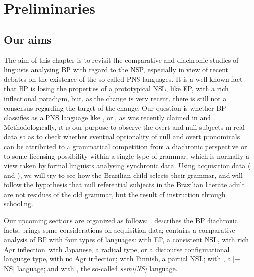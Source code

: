 \documentclass[output=paper]{langsci/langscibook}
\begin{document}
\section{Preliminaries}\label{sec:26.2}

\subsection{Our aims}\label{sec:26.2.1}

The aim of this chapter is to revisit the comparative and diachronic studies of
linguists analysing \gls{BP} with regard to the \gls{NSP}, especially in view
of recent debates on the existence of the so-called \gls{PNS} languages.  It is
a well known fact that \gls{BP} is losing the
properties of a prototypical \gls{NSL}, like \gls{EP}, with a rich
inflectional paradigm, but, as the change is very recent, there is still not a
consensus regarding the target of the change. Our question is whether
\gls{BP} classifies as a \gls{PNS} language like
,  or , as was recently claimed in
\citet{Holmberg2010} and \citet{HolShee2010}. Methodologically, it is our
purpose to observe the overt and null subjects in real data so as to check
whether eventual optionality of null and overt pronominals can be attributed to
a grammatical competition from a diachronic perspective \citep{Kroch1994} or to
some licensing possibility within a single type of grammar, which is normally a
view taken by formal linguists analysing synchronic data. Using
acquisition data (\citealt{Magalhaes2003} and
\citealt{Kato2011}), we will try to see how the Brazilian child selects their
grammar, and will follow the hypothesis that null referential subjects in the
Brazilian literate adult are not residues of the old grammar, but the result of
instruction through schooling.

Our  upcoming sections are organized as follows:  .
describes the \gls{BP} diachronic facts;
 brings some considerations on acquisition data;
 contains a comparative analysis of \gls{BP} with four types of languages:  with
\gls{EP}, a consistent \gls{NSL}, with rich Agr
inflection;  with Japanese, a radical type, or a discourse
configurational language type, with no Agr inflection; 
with Finnish, a partial \gls{NSL};  with , a
[$-$NS] language; and  with , the so-called
\emph{semi[NS]} language.
\end{document}
